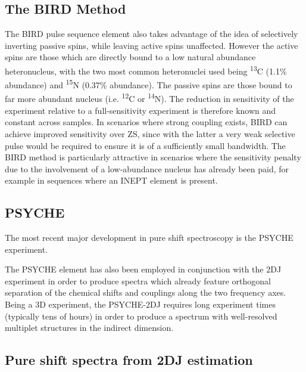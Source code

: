 \subsection{The \acs{BIRD} Method}
The \ac{BIRD} pulse sequence element\cite{Garbow1982,Bax1983} also takes
advantage of the idea of selectively inverting passive spins, while leaving
active spins unaffected.
However the active spins are those which are directly bound to a low natural
abundance
heteronucleus, with the two most common heteronuclei used being
\textsuperscript{13}C (1.1\% abundance) and \textsuperscript{15}N (0.37\%
abundance).
The passive spins are those bound to far more abundant nucleus (i.e.
\textsuperscript{12}C or \textsuperscript{14}N). The reduction in sensitivity
of the experiment relative to a full-sensitivity experiment is therefore known
and constant across samples. In scenarios where strong coupling exists, \ac{BIRD} can
achieve improved sensitivity over \ac{ZS}, since with the latter a very weak
selective pulse would be required to ensure it is of a sufficiently small
bandwidth. The \ac{BIRD} method is particularly attractive in scenarios where
the sensitivity penalty due to the involvement of a low-abundance nucleus has
already been paid, for example in sequences where an \ac{INEPT} element is
present\cite{Paudel2013}.

\subsection{\acs{PSYCHE}}
\label{subsec:psyche}
The most recent major development in pure shift spectroscopy is the \ac{PSYCHE}
experiment\cite{Foroozandeh2014,Foroozandeh2018}.

The \ac{PSYCHE} element has also been employed in conjunction with the \ac{2DJ}
experiment in order to produce spectra which already feature orthogonal
separation of the chemical shifts and couplings along the two frequency
axes\cite{Foroozandeh2015,Kiraly2017}. Being a 3D experiment, the
\ac{PSYCHE}-\ac{2DJ} requires long experiment times (typically tens of hours)
in order to produce a spectrum with well-resolved multiplet structures in the
indirect dimension.

\subsection{Pure shift spectra from 2DJ estimation}

